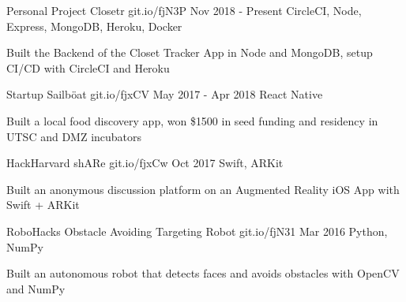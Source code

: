 \begin{cventries}
\cventry
    {Personal Project}
    {Closetr}
    {git.io/fjN3P}
    {Nov 2018 - Present}
    {CircleCI, Node, Express, MongoDB, Heroku, Docker}
    {
      \begin{cvitems}
        \item{Built the Backend of the Closet Tracker App in Node and MongoDB, setup CI/CD with CircleCI and Heroku}
      \end{cvitems}
    }
\cventry
  {Startup}
  {Sailböat}
  {git.io/fjxCV}
  {May 2017 - Apr 2018}
  {React Native}
  {
    \begin{cvitems}
      \item {Built a local food discovery app, won \$1500 in seed funding and residency in UTSC and DMZ incubators}
    \end{cvitems}
  }
\cventry
  {HackHarvard}
  {shARe}
  {git.io/fjxCw}
  {Oct 2017}
  {Swift, ARKit}
  {
    \begin{cvitems}
      \item {Built an anonymous discussion platform on an Augmented Reality iOS App with Swift + ARKit}
    \end{cvitems}
  }
\cventry
  {RoboHacks}
  {Obstacle Avoiding Targeting Robot}
  {git.io/fjN31}
  {Mar 2016}
  {Python, NumPy}
  {
    \begin{cvitems}
      \item {Built an autonomous robot that detects faces and avoids obstacles with OpenCV and NumPy}
    \end{cvitems}
  }
\end{cventries}

